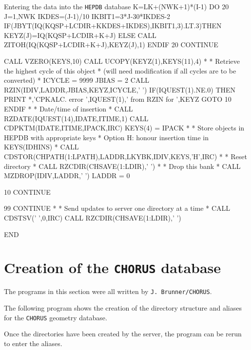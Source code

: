\begin{XMPt}{Entering the data into the {\tt HEPDB} database}
         K=LK+(NWK+1)*(I-1)
         DO 20 J=1,NWK
            IKDES=(J-1)/10
            IKBIT1=3*J-30*IKDES-2
            IF(JBYT(IQ(KQSP+LCDIR+KKDES+IKDES),IKBIT1,3).LT.3)THEN
               KEYZ(J)=IQ(KQSP+LCDIR+K+J)
            ELSE
               CALL ZITOH(IQ(KQSP+LCDIR+K+J),KEYZ(J),1)
            ENDIF
   20    CONTINUE

         CALL VZERO(KEYS,10)
         CALL UCOPY(KEYZ(1),KEYS(11),4)
*
*     Retrieve the highest cycle of this object
*     (will need modification if all cycles are to be converted)
*
         ICYCLE = 9999
         JBIAS = 2
         CALL RZIN(IDIV,LADDR,JBIAS,KEYZ,ICYCLE,' ')
         IF(IQUEST(1).NE.0) THEN
            PRINT *,'CPKALC. error ',IQUEST(1),' from RZIN for ',KEYZ
            GOTO 10
         ENDIF
*
*     Date/time of insertion
*
         CALL RZDATE(IQUEST(14),IDATE,ITIME,1)
         CALL CDPKTM(IDATE,ITIME,IPACK,IRC)
         KEYS(4) = IPACK
*
*     Store objects in HEPDB with appropriate keys
*     Option H: honour insertion time in KEYS(IDHINS)
*
         CALL CDSTOR(CHPATH(1:LPATH),LADDR,LKYBK,IDIV,KEYS,'H',IRC)
*
*     Reset directory
*
         CALL RZCDIR(CHSAVE(1:LDIR),' ')
*
*     Drop this bank
*
         CALL MZDROP(IDIV,LADDR,' ')
         LADDR = 0

   10 CONTINUE

   99 CONTINUE
*
*     Send updates to server one directory at a time
*
      CALL CDSTSV(' ',0,IRC)
      CALL RZCDIR(CHSAVE(1:LDIR),' ')

      END
\end{XMPt}

\section{Creation of the {\tt CHORUS} database}

The programs in this section were all written by
{\tt J. Brunner/CHORUS}.

The following program shows the creation of the directory
structure and aliases for the {\tt CHORUS} geometry database.

Once the directories have been created by the server,
the program can be rerun to enter the aliases.

